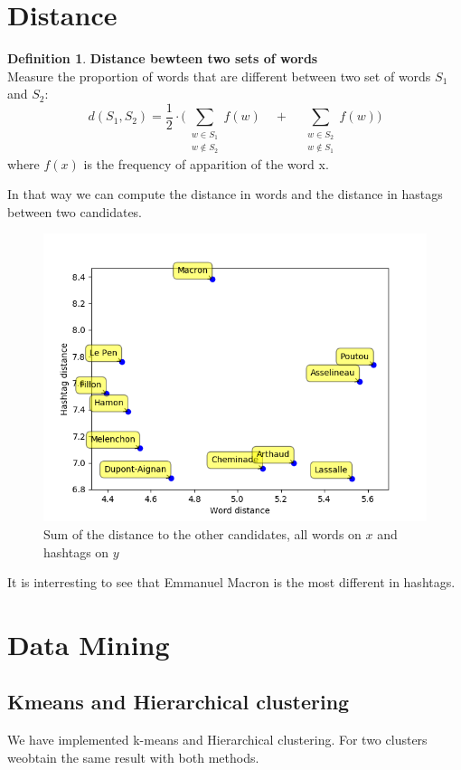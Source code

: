 \documentclass[a4paper]{article}
\theoremstyle{definition}
\newtheorem{definition}{Definition}[section]
\begin{document}
\section{Distance}
\theoremstyle{definition}
\begin{definition}{\bf Distance bewteen two sets of words\\}
Measure the proportion of words that are different between two set of words $S_1$ and $S_2$:
\[
d(S_1, S_2)= \frac{1}{2} \cdot \Big( \sum_{\substack{w \in S_1\\w \notin S_2}}f(w) \quad + \quad \sum_{\substack{w \in S_2\\w \notin S_1}} f(w) \Big) 
\]
where $f(x)$ is the frequency of apparition of the word x.
\end{definition}

In that way we can compute the distance in words and the distance in hastags between two candidates.
\begin{figure}
\label{fig:image2}
\includegraphics[width=\textwidth]{distances.png}
\caption{Sum of the distance to the other candidates, all words on $x$ and hashtags on $y$}
\end{figure}

It is interresting to see that Emmanuel Macron is the most different in hashtags.

\section{Data Mining}
\subsection{Kmeans and Hierarchical clustering}
We have implemented k-means and Hierarchical clustering.
For two clusters weobtain the same result with both methods.
\end{document}
